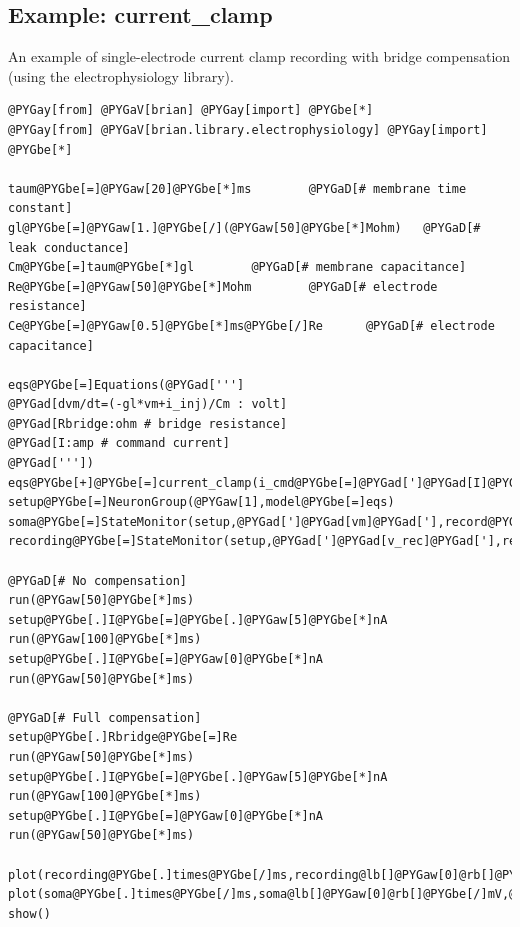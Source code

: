 \documentclass[letterpaper,10pt]{manual}
\begin{document}
\resetcurrentobjects
{}

\hypertarget{index-31}{}\subsection{Example: current\_clamp}

An example of single-electrode current clamp recording
with bridge compensation (using the electrophysiology library).

\begin{Verbatim}[commandchars=@\[\]]
@PYGay[from] @PYGaV[brian] @PYGay[import] @PYGbe[*]
@PYGay[from] @PYGaV[brian.library.electrophysiology] @PYGay[import] @PYGbe[*]

taum@PYGbe[=]@PYGaw[20]@PYGbe[*]ms        @PYGaD[# membrane time constant]
gl@PYGbe[=]@PYGaw[1.]@PYGbe[/](@PYGaw[50]@PYGbe[*]Mohm)   @PYGaD[# leak conductance]
Cm@PYGbe[=]taum@PYGbe[*]gl        @PYGaD[# membrane capacitance]
Re@PYGbe[=]@PYGaw[50]@PYGbe[*]Mohm        @PYGaD[# electrode resistance]
Ce@PYGbe[=]@PYGaw[0.5]@PYGbe[*]ms@PYGbe[/]Re      @PYGaD[# electrode capacitance]

eqs@PYGbe[=]Equations(@PYGad[''']
@PYGad[dvm/dt=(-gl*vm+i_inj)/Cm : volt]
@PYGad[Rbridge:ohm # bridge resistance]
@PYGad[I:amp # command current]
@PYGad['''])
eqs@PYGbe[+]@PYGbe[=]current_clamp(i_cmd@PYGbe[=]@PYGad[']@PYGad[I]@PYGad['],Re@PYGbe[=]Re,Ce@PYGbe[=]Ce,bridge@PYGbe[=]@PYGad[']@PYGad[Rbridge]@PYGad['])
setup@PYGbe[=]NeuronGroup(@PYGaw[1],model@PYGbe[=]eqs)
soma@PYGbe[=]StateMonitor(setup,@PYGad[']@PYGad[vm]@PYGad['],record@PYGbe[=]@PYGaA[True])
recording@PYGbe[=]StateMonitor(setup,@PYGad[']@PYGad[v_rec]@PYGad['],record@PYGbe[=]@PYGaA[True])

@PYGaD[# No compensation]
run(@PYGaw[50]@PYGbe[*]ms)
setup@PYGbe[.]I@PYGbe[=]@PYGbe[.]@PYGaw[5]@PYGbe[*]nA
run(@PYGaw[100]@PYGbe[*]ms)
setup@PYGbe[.]I@PYGbe[=]@PYGaw[0]@PYGbe[*]nA
run(@PYGaw[50]@PYGbe[*]ms)

@PYGaD[# Full compensation]
setup@PYGbe[.]Rbridge@PYGbe[=]Re
run(@PYGaw[50]@PYGbe[*]ms)
setup@PYGbe[.]I@PYGbe[=]@PYGbe[.]@PYGaw[5]@PYGbe[*]nA
run(@PYGaw[100]@PYGbe[*]ms)
setup@PYGbe[.]I@PYGbe[=]@PYGaw[0]@PYGbe[*]nA
run(@PYGaw[50]@PYGbe[*]ms)

plot(recording@PYGbe[.]times@PYGbe[/]ms,recording@lb[]@PYGaw[0]@rb[]@PYGbe[/]mV,@PYGad[']@PYGad[b]@PYGad['])
plot(soma@PYGbe[.]times@PYGbe[/]ms,soma@lb[]@PYGaw[0]@rb[]@PYGbe[/]mV,@PYGad[']@PYGad[r]@PYGad['])
show()
\end{Verbatim}
\end{document}
